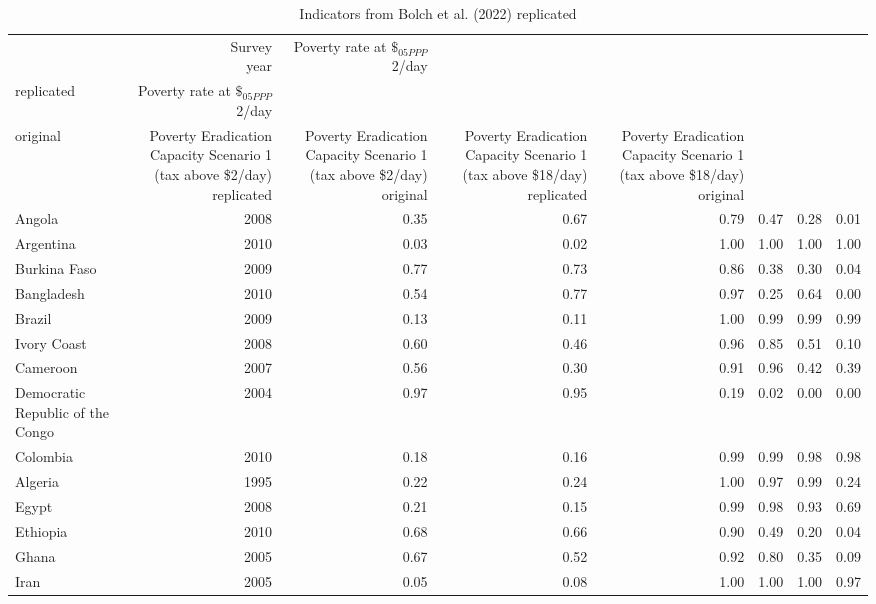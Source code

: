 
\begin{longtable}[t]{lrrrrrrr}
\caption{\label{tab:bolch_replication}Indicators from Bolch et al. (2022) replicated}\\
\toprule
  & \makecell{Survey\\year} & \makecell{Poverty rate\\at $\$_{05PPP}$2}/day\\replicated & \makecell{Poverty rate\\at $\$_{05PPP}$2}/day\\original & \makecell{Poverty Eradication Capacity\\Scenario 1 (tax above \$2/day)\\replicated} & \makecell{Poverty Eradication Capacity\\Scenario 1 (tax above \$2/day)\\original} & \makecell{Poverty Eradication Capacity\\Scenario 1 (tax above \$18/day)\\replicated} & \makecell{Poverty Eradication Capacity\\Scenario 1 (tax above \$18/day)\\original}\\
\midrule
Angola & 2008 & 0.35 & 0.67 & 0.79 & 0.47 & 0.28 & 0.01\\
Argentina & 2010 & 0.03 & 0.02 & 1.00 & 1.00 & 1.00 & 1.00\\
Burkina Faso & 2009 & 0.77 & 0.73 & 0.86 & 0.38 & 0.30 & 0.04\\
Bangladesh & 2010 & 0.54 & 0.77 & 0.97 & 0.25 & 0.64 & 0.00\\
Brazil & 2009 & 0.13 & 0.11 & 1.00 & 0.99 & 0.99 & 0.99\\
Ivory Coast & 2008 & 0.60 & 0.46 & 0.96 & 0.85 & 0.51 & 0.10\\
Cameroon & 2007 & 0.56 & 0.30 & 0.91 & 0.96 & 0.42 & 0.39\\
Democratic Republic of the Congo & 2004 & 0.97 & 0.95 & 0.19 & 0.02 & 0.00 & 0.00\\
Colombia & 2010 & 0.18 & 0.16 & 0.99 & 0.99 & 0.98 & 0.98\\
Algeria & 1995 & 0.22 & 0.24 & 1.00 & 0.97 & 0.99 & 0.24\\
Egypt & 2008 & 0.21 & 0.15 & 0.99 & 0.98 & 0.93 & 0.69\\
Ethiopia & 2010 & 0.68 & 0.66 & 0.90 & 0.49 & 0.20 & 0.04\\
Ghana & 2005 & 0.67 & 0.52 & 0.92 & 0.80 & 0.35 & 0.09\\
Iran & 2005 & 0.05 & 0.08 & 1.00 & 1.00 & 1.00 & 0.97\\

\end{longtable}
